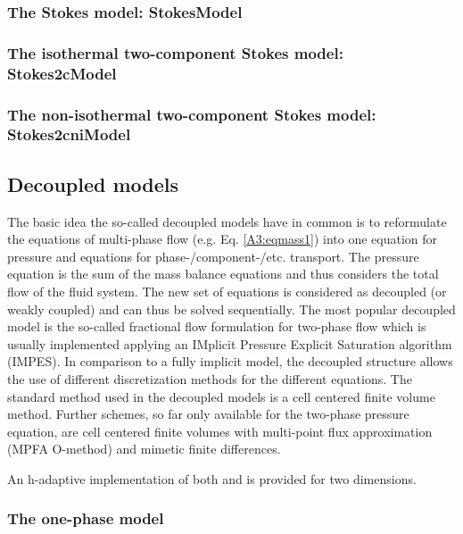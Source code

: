 \subsubsection{The Stokes model: StokesModel} 


\subsubsection{The isothermal two-component Stokes model: Stokes2cModel} 


\subsubsection{The non-isothermal two-component Stokes model: Stokes2cniModel} 


\subsection{Decoupled models}
%
The basic idea the so-called decoupled models have in common is to reformulate the equations of multi-phase flow (e.g. Eq. \ref{A3:eqmass1}) into one equation for pressure and equations for phase-/component-/etc. transport. The pressure equation is the sum of the mass balance equations and thus considers the total flow of the fluid system. The new set of equations is considered as decoupled (or weakly coupled) and can thus be solved sequentially. The most popular decoupled model is the so-called fractional flow formulation for two-phase flow which is usually implemented applying an IMplicit Pressure Explicit Saturation algorithm (IMPES).
In comparison to a fully implicit model, the decoupled structure allows the use of different discretization methods for the different equations. The standard method used in the decoupled models is a cell centered finite volume method. Further schemes, so far only available for the two-phase pressure equation, are cell centered finite volumes with multi-point flux approximation (MPFA O-method) and mimetic finite differences.

An h-adaptive implementation of both  and  is provided for two dimensions.
%
\subsubsection{The one-phase model}


